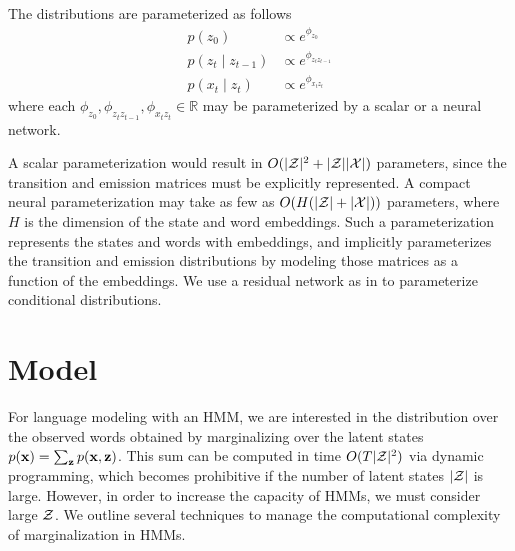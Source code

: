 \documentclass[11pt,a4paper]{article}
\begin{document}


The distributions are parameterized as follows
\begin{equation}
\label{param}
\begin{aligned}
p(z_0) &\propto e^{\phi_{z_0}}\\
p(z_t \mid z_{t-1}) &\propto e^{\phi_{z_tz_{t-1}}}\\
p(x_t \mid z_t) &\propto e^{\phi_{x_tz_t}}
\end{aligned}
\end{equation}
where each $\phi_{z_0},\phi_{z_tz_{t-1}},\phi_{x_tz_t} \in \mathbb{R}$
may be parameterized by a scalar or a neural network.

A scalar parameterization would result in $O(|\mathcal{Z}|^2 + |\mathcal{Z}||\mathcal{X}|)$ parameters,
since the transition and emission matrices must be explicitly represented.
A compact neural parameterization may take as few as $O(H(|\mathcal{Z}| + |\mathcal{X}|))$ parameters,
where $H$ is the dimension of the state and word embeddings.
Such a parameterization represents the states and words with embeddings,
and implicitly parameterizes the transition and emission distributions
by modeling those matrices as a function of the embeddings.
We use a residual network as in \citet{kim2019cpcfg} to parameterize conditional distributions.

\section{Model}
For language modeling with an HMM,
we are interested in the distribution over the observed words
obtained by marginalizing over the latent states $p(\mathbf{x}) = \sum_{\mathbf{z}}p(\mathbf{x},\mathbf{z})$.
This sum can be computed in time $O(T|\mathcal{Z}|^2)$ via dynamic programming,
which becomes prohibitive if the number of latent states $|\mathcal{Z}|$ is large.
However, in order to increase the capacity of HMMs, we must consider large $\mathcal{Z}$.
We outline several techniques to manage the computational complexity of marginalization in HMMs.  
\end{document}
